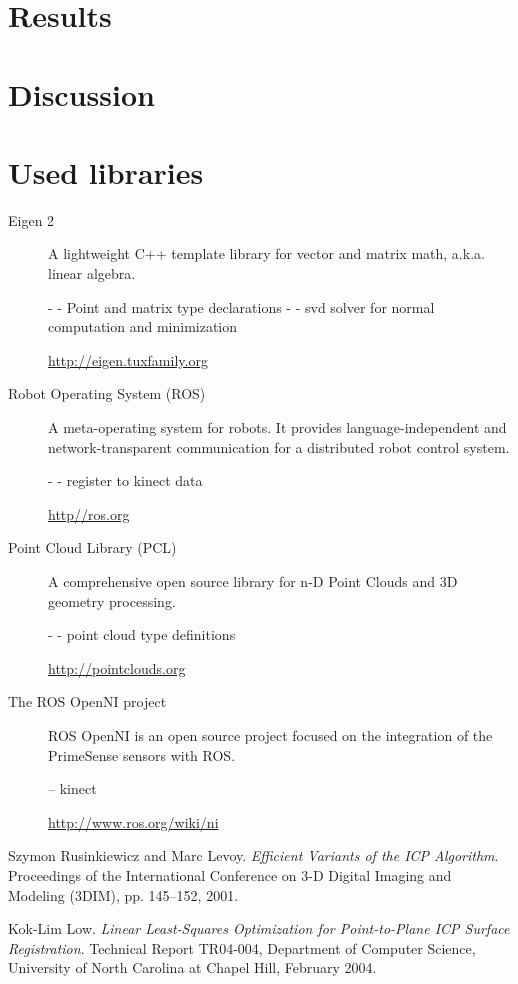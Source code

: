 \documentclass[10pt,twocolumn,letterpaper]{article}
\begin{document}
\section{Results}

\section{Discussion}

\section{Used libraries}
\begin{description}
\item[Eigen 2]
A lightweight C++ template library for vector and matrix math,
a.k.a. linear algebra.

- - Point and matrix type declarations
- - svd solver for normal computation and minimization

\href{http://eigen.tuxfamily.org}{http://eigen.tuxfamily.org}

\item[Robot Operating System (ROS)]
A meta-operating system for robots. It provides
language-independent and network-transparent communication for a
distributed robot control system.

- - register to kinect data

\href{http://ros.org}{http//ros.org}

\item[Point Cloud Library (PCL)]
A comprehensive open source library for n-D Point Clouds and 3D geometry processing.

- - point cloud type definitions

\href{http://pointclouds.org}{http://pointclouds.org}

\item[The ROS OpenNI project]
ROS OpenNI is an open source project focused on the integration of the PrimeSense sensors with ROS.

-- kinect

\href{http://www.ros.org/wiki/ni}{http://www.ros.org/wiki/ni}

\end{description}

{\small


}

\begin{thebibliography}{99}
Szymon Rusinkiewicz and Marc Levoy.
\emph{Efficient Variants of the ICP Algorithm}.
Proceedings of the International Conference on 3-D Digital Imaging and
Modeling (3DIM), pp. 145–152, 2001.

Kok-Lim Low.
\emph{Linear Least-Squares Optimization for
Point-to-Plane ICP Surface Registration}.
Technical Report TR04-004, Department of Computer Science, University of North Carolina at Chapel Hill, February 2004.

\end{thebibliography}
\end{document}
